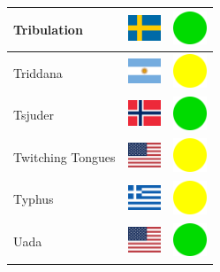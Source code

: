 \documentclass[12pt, a4paper, twoside]{report}
\begin{document}
\begin{center}
\begin{longtable}{|p{5cm}|p{2cm}|p{2cm}|}
 Tribulation                                                & \includegraphics[width=1cm]{../img/flags/se} &   \includegraphics[width=1cm]{../likes/y} \\ \hline
 Triddana                                                   & \includegraphics[width=1cm]{../img/flags/ar} &   \includegraphics[width=1cm]{../likes/m} \\ \hline
 Tsjuder                                                    & \includegraphics[width=1cm]{../img/flags/no} &   \includegraphics[width=1cm]{../likes/y} \\ \hline
 Twitching Tongues                                          & \includegraphics[width=1cm]{../img/flags/us} &   \includegraphics[width=1cm]{../likes/m} \\ \hline
 Typhus                                                     & \includegraphics[width=1cm]{../img/flags/gr} &   \includegraphics[width=1cm]{../likes/m} \\ \hline
 Uada                                                       & \includegraphics[width=1cm]{../img/flags/us} &   \includegraphics[width=1cm]{../likes/y} \\ \hline

\end{longtable}
\end{center}
\end{document}

